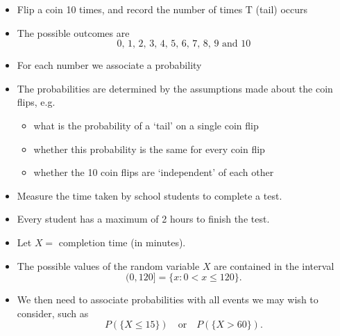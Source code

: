 \documentclass[smaller, handout]{beamer}\usepackage[]{graphicx}\usepackage[]{color}
\newenvironment{stepitemize}{\begin{itemize}[<+->]}{\end{itemize} }
\begin{document}
\begin{frame}{\secname}
  \begin{example}
  \begin{itemize}
  \item Flip a coin 10 times, and record the number of times T (tail) occurs
  \item The possible outcomes are
  \begin{equation*}
  \text{0, 1, 2, 3, 4, 5, 6, 7, 8, 9 and 10}
  \end{equation*}
  \item For each number we associate a probability
  \vspace{2cm}
  \pause
  \item The probabilities are determined by the assumptions made about the
  coin flips, e.g.
  \begin{itemize}
    \item what is the probability of a `tail' on a single coin flip
    \item whether this probability is the same for every coin flip
    \item whether the 10 coin flips are `independent' of each other
  \end{itemize}
  \end{itemize}

  \end{example}
\end{frame}

\begin{frame}{\secname}
  \begin{example}
  \begin{stepitemize}
  \item Measure the time taken by school students to complete a test.
  \item Every student has a maximum of 2 hours to finish the test.
  \pause
  \item Let $X=$ completion time (in minutes).
  \item The possible values of the random variable $X$ are contained in the interval
  $$(0,120]=\{x:0<x\leq 120\}.$$
  \item We then need to associate probabilities with all events we may wish to
  consider, such as
  $$P\left(\{ X\leq 15\}\right) \quad  \text{or} \quad P\left(\{ X>60\}\right).$$
  \end{stepitemize}
  \end{example}
\end{frame}
\end{document}
